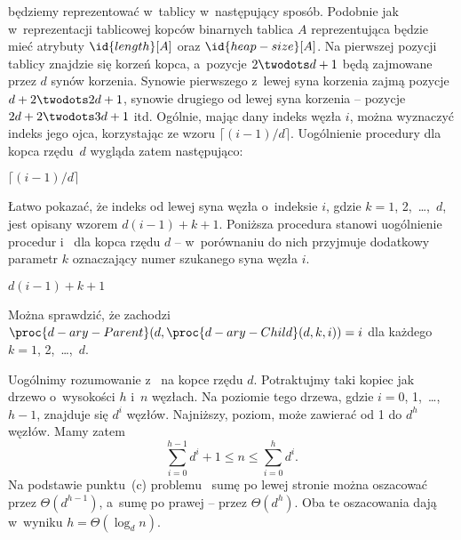 
\subproblem %
 będziemy reprezentować w~tablicy w~następujący sposób. Podobnie jak w~reprezentacji tablicowej kopców binarnych tablica $A$ reprezentująca  będzie mieć atrybuty $\id{length}[A]$ oraz $\id{heap-size}[A]$. Na pierwszej pozycji tablicy znajdzie się korzeń kopca, a~pozycje $2\twodots d+1$ będą zajmowane przez $d$ synów korzenia. Synowie pierwszego z~lewej syna korzenia zajmą pozycje $d+2\twodots2d+1$, synowie drugiego od lewej syna korzenia -- pozycje $2d+2\twodots3d+1$ itd. Ogólnie, mając dany indeks węzła $i$, można wyznaczyć indeks jego ojca, korzystając ze wzoru $\lceil(i-1)/d\rceil$. Uogólnienie procedury  dla kopca rzędu~$d$ wygląda zatem następująco:
\begin{codebox}
\zi	\Return $\lceil(i-1)/d\rceil$
\end{codebox}

Łatwo pokazać, że indeks  od lewej syna węzła o~indeksie $i$, gdzie $k=1$, 2,~\dots,~$d$, jest opisany wzorem $d(i-1)+k+1$. Poniższa procedura stanowi uogólnienie procedur  i~ dla kopca rzędu $d$ -- w~porównaniu do nich przyjmuje dodatkowy parametr $k$ oznaczający numer szukanego syna węzła $i$.
\begin{codebox}
\zi	\Return $d(i-1)+k+1$
\end{codebox}

Można sprawdzić, że zachodzi $\proc{d-ary-Parent}(d,\proc{d-ary-Child}(d,k,i))=i$ dla każdego $k=1$, 2,~\dots,~$d$.

\subproblem %
Uogólnimy rozumowanie z~ na kopce rzędu $d$. Potraktujmy taki kopiec jak drzewo  o~wysokości $h$ i~$n$ węzłach. Na  poziomie tego drzewa, gdzie $i=0$, 1,~\dots,~$h-1$, znajduje się $d^i$ węzłów. Najniższy,  poziom, może zawierać od 1 do $d^h$ węzłów. Mamy zatem
\[
    \sum_{i=0}^{h-1}d^i+1 \le n \le \sum_{i=0}^hd^i.
\]
Na podstawie punktu~(c) problemu~ sumę po lewej stronie można oszacować przez $\Theta(d^{h-1})$, a~sumę po prawej -- przez $\Theta(d^h)$. Oba te oszacowania dają w~wyniku $h=\Theta(\log_dn)$.

